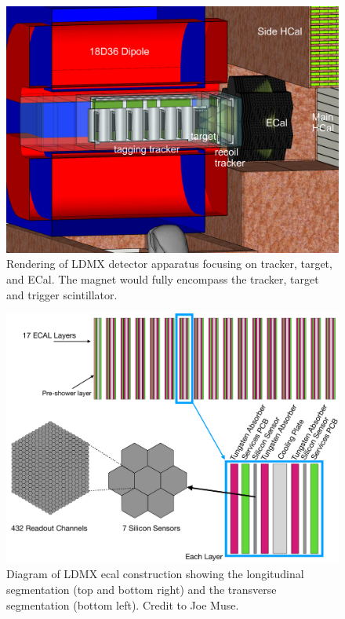 \begin{figure}
  \centering
  \includegraphics[width=\textwidth]{figures/ldmx/experiment/LDMX_FOA_CLOSE.PNG}
  \caption{
    Rendering of LDMX detector apparatus focusing on tracker, target, and ECal.
    The magnet would fully encompass the tracker, target and trigger scintillator.
  }
  \label{fig:ldmx-render}
\end{figure}

\begin{figure}
  \centering
  \includegraphics[width=\textwidth]{figures/ldmx/experiment/ecal.pdf}
  \caption{
    Diagram of LDMX \ac{ecal} construction showing the longitudinal segmentation
    (top and bottom right) and the transverse segmentation (bottom left).
    Credit to Joe Muse.
  }
  \label{fig:ldmx-ecal}
\end{figure}
